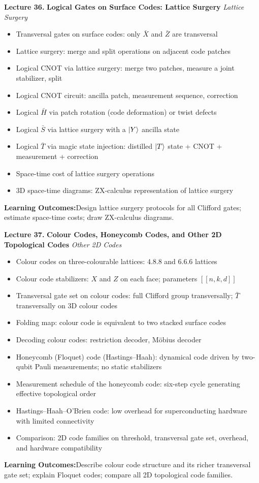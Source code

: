 \documentclass[12pt,oneside]{article}
\newcommand{\lecturetitle}[3]{%
  \vspace{10pt}
  \begin{tcolorbox}[
    enhanced,breakable,
    colback=highlight,colframe=accent,
    arc=2pt,left=10pt,right=8pt,top=7pt,bottom=7pt,boxrule=0.7pt
  ]
    \textbf{\color{accent}Lecture #1.\enspace}%
    {\color{primary}\bfseries #2}%
    \hfill{\small\color{warmgold}\textit{#3}}
  \end{tcolorbox}
  \vspace{-2pt}
}
\newcommand{\topics}[1]{%
  \begin{itemize}[leftmargin=1.5em,itemsep=1.5pt,topsep=3pt,parsep=0pt]
    #1
  \end{itemize}\vspace{2pt}
}
\newcommand{\T}[1]{\item #1}
\newcommand{\keybox}[1]{%
  \begin{tcolorbox}[
    enhanced,colback=lightgray,colframe=rulegray,
    arc=2pt,left=8pt,right=8pt,top=5pt,bottom=5pt,boxrule=0.4pt,
    fontupper=\small
  ]
    \textbf{\color{primary}Learning Outcomes:\enspace}#1
  \end{tcolorbox}\vspace{4pt}
}
\begin{document}
\lecturetitle{36}{Logical Gates on Surface Codes: Lattice Surgery}{Lattice Surgery}

\topics{
  \T{Transversal gates on surface codes: only $\bar{X}$ and $\bar{Z}$ are transversal}
  \T{Lattice surgery: merge and split operations on adjacent code patches}
  \T{Logical CNOT via lattice surgery: merge two patches, measure a joint stabilizer, split}
  \T{Logical CNOT circuit: ancilla patch, measurement sequence, correction}
  \T{Logical $\bar{H}$ via patch rotation (code deformation) or twist defects}
  \T{Logical $\bar{S}$ via lattice surgery with a $\ket{Y}$ ancilla state}
  \T{Logical $\bar{T}$ via magic state injection: distilled $\ket{T}$ state + CNOT + measurement + correction}
  \T{Space-time cost of lattice surgery operations}
  \T{3D space-time diagrams: ZX-calculus representation of lattice surgery}
}

\keybox{Design lattice surgery protocols for all Clifford gates; estimate space-time costs; draw ZX-calculus diagrams.}

\lecturetitle{37}{Colour Codes, Honeycomb Codes, and Other 2D Topological Codes}{Other 2D Codes}

\topics{
  \T{Colour codes on three-colourable lattices: 4.8.8 and 6.6.6 lattices}
  \T{Colour code stabilizers: $X$ and $Z$ on each face; parameters $[[n, k, d]]$}
  \T{Transversal gate set on colour codes: full Clifford group transversally; $\bar{T}$ transversally on 3D colour codes}
  \T{Folding map: colour code is equivalent to two stacked surface codes}
  \T{Decoding colour codes: restriction decoder, Möbius decoder}
  \T{Honeycomb (Floquet) code (Hastings--Haah): dynamical code driven by two-qubit Pauli measurements; no static stabilizers}
  \T{Measurement schedule of the honeycomb code: six-step cycle generating effective topological order}
  \T{Hastings--Haah--O'Brien code: low overhead for superconducting hardware with limited connectivity}
  \T{Comparison: 2D code families on threshold, transversal gate set, overhead, and hardware compatibility}
}

\keybox{Describe colour code structure and its richer transversal gate set; explain Floquet codes; compare all 2D topological code families.}
\end{document}
